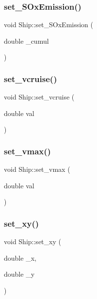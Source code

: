 \subsubsection{\texorpdfstring{set\_SOxEmission()}{set\_SOxEmission()}}
{\footnotesize\ttfamily void Ship\+::set\+\_\+\+S\+Ox\+Emission (\begin{DoxyParamCaption}\item[{double}]{\+\_\+cumul }\end{DoxyParamCaption})}

\mbox{\label{class_ship_a6bf88532d109acb4bad7540a5d28a38f}} 
\subsubsection{\texorpdfstring{set\_vcruise()}{set\_vcruise()}}
{\footnotesize\ttfamily void Ship\+::set\+\_\+vcruise (\begin{DoxyParamCaption}\item[{double}]{val }\end{DoxyParamCaption})}

\mbox{\label{class_ship_aa8cac550988f1bb1ce13cb5420860bd6}} 
\subsubsection{\texorpdfstring{set\_vmax()}{set\_vmax()}}
{\footnotesize\ttfamily void Ship\+::set\+\_\+vmax (\begin{DoxyParamCaption}\item[{double}]{val }\end{DoxyParamCaption})}

\mbox{\label{class_ship_a66be1579e64ee188b0a5f4f77f4490e0}} 
\subsubsection{\texorpdfstring{set\_xy()}{set\_xy()}\hspace{0.1cm}{\footnotesize\ttfamily [1/2]}}
{\footnotesize\ttfamily void Ship\+::set\+\_\+xy (\begin{DoxyParamCaption}\item[{double}]{\+\_\+x,  }\item[{double}]{\+\_\+y }\end{DoxyParamCaption})}

